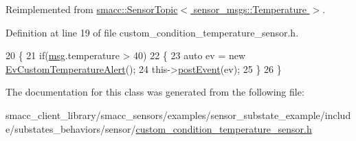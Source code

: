Reimplemented from \hyperlink{classsmacc_1_1SensorTopic_a1160ef981ab390d75d862a6067615e41}{smacc\+::\+Sensor\+Topic$<$ sensor\+\_\+msgs\+::\+Temperature $>$}.



Definition at line 19 of file custom\+\_\+condition\+\_\+temperature\+\_\+sensor.\+h.


\begin{DoxyCode}
20   \{
21     \textcolor{keywordflow}{if}(\hyperlink{namespacekeyboard__node_a768777e12f75b89e4a0a60acf748e9eb}{msg}.temperature > 40)
22     \{
23       \textcolor{keyword}{auto} ev = \textcolor{keyword}{new} \hyperlink{structEvCustomTemperatureAlert}{EvCustomTemperatureAlert}();
24       this->\hyperlink{classsmacc_1_1SmaccSubStateBehavior_a8538664f9828247727a27446112788a2}{postEvent}(ev);
25     \}
26   \} 
\end{DoxyCode}


The documentation for this class was generated from the following file\+:\begin{DoxyCompactItemize}
\item 
smacc\+\_\+client\+\_\+library/smacc\+\_\+sensors/examples/sensor\+\_\+substate\+\_\+example/include/substates\+\_\+behaviors/sensor/\hyperlink{custom__condition__temperature__sensor_8h}{custom\+\_\+condition\+\_\+temperature\+\_\+sensor.\+h}\end{DoxyCompactItemize}
